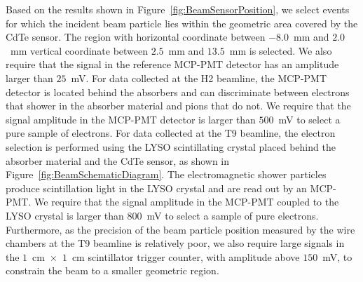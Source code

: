 Based on the results shown in Figure~\ref{fig:BeamSensorPosition}, we select events
for which the incident beam particle lies within the geometric area covered by the 
CdTe sensor. The region with horizontal coordinate between $-8.0$~mm and $2.0$~mm
vertical coordinate between $2.5$~mm and $13.5$~mm is selected. We also require that the 
signal in the reference MCP-PMT detector has an amplitude larger than $25$~mV. 
For data collected at the H2 beamline, the MCP-PMT detector is located behind
the absorbers and can discriminate between electrons that shower in the absorber
material and pions that do not. We require that the signal amplitude in the 
MCP-PMT detector is larger than $500$~mV to select a pure sample of electrons. For
data collected at the T9 beamline, the electron selection is performed using
the LYSO scintillating crystal placed behind the absorber material and the CdTe sensor,
as shown in Figure~\ref{fig:BeamSchematicDiagram}. The electromagnetic shower particles produce
scintillation light in the LYSO crystal and are read out by an MCP-PMT. We require that
the signal amplitude in the MCP-PMT coupled to the LYSO crystal is larger than $800$~mV
to select a sample of pure electrons. Furthermore, as the precision of the beam particle position 
measured by the wire chambers at the T9 beamline is relatively poor, we also require
large signals in the $1$~cm~$\times$~$1$~cm scintillator trigger counter, with
amplitude above $150$~mV, to constrain the beam to a smaller geometric region. 
